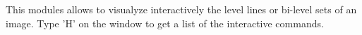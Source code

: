 This modules allows to visualyze interactively the level lines or
bi-level sets of an image. Type 'H' on the window to get a list
of the interactive commands.
